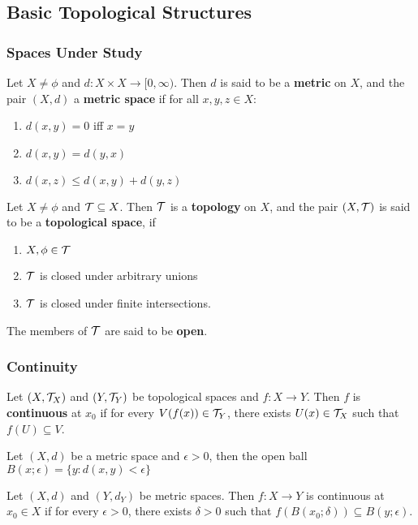 	\subsection{Basic Topological Structures}
		\begin{frame}
		\frametitle{Spaces Under Study}
		
		\begin{defn}
		Let $X\neq\phi$ and $d:X\times X\rightarrow [0,\infty)$. Then $d$ is said to be a \textbf{metric} on $X$, and the pair
		$(X,d)$ a \textbf{metric space} if for all $x,y,z\in X$:
			\begin{enumerate}
				\item $d(x,y) = 0$ iff $x=y$
				\item $d(x,y) = d(y,x)$
				\item $d(x,z) \leq d(x,y) + d(y,z)$
			\end{enumerate}
		\end{defn}
		
		\begin{defn}
		Let $X\neq\phi$ and $\mathcal{T}\subseteq X$. Then $\mathcal{T}$ is a \textbf{topology} on $X$, and the pair $(X,\mathcal{T})$ is said to be a \textbf{topological space}, if
			\begin{enumerate}
				\item $X,\phi\in\mathcal{T}$
				\item $\mathcal{T}$ is closed under arbitrary unions
				\item $\mathcal{T}$ is closed under finite intersections.
			\end{enumerate}
		The members of $\mathcal{T}$ are said to be \textbf{open}.
		\end{defn}
		\end{frame}
		
		\begin{frame}
		\frametitle{Continuity}
		
		\begin{defn}
		Let $(X,\mathcal{T}_X)$ and $(Y,\mathcal{T}_Y)$ be topological spaces and $f:X\rightarrow Y$. Then $f$ is \textbf{continuous} at $x_0$ if for every $V(f(x))\in\mathcal{T}_Y$, there exists $U(x)\in \mathcal{T}_X$ such that $f(U)\subseteq V$.
		\end{defn}
		
		\begin{defn}
		Let $(X,d)$ be a metric space and $\epsilon>0$, then the open ball $B(x;\epsilon)=\{y: d(x,y)<\epsilon\}$
		\end{defn}
		
		\begin{defn}
		Let $(X,d)$ and $(Y,d_Y)$ be metric spaces. Then $f:X\rightarrow Y$ is continuous at $x_0\in X$ if for every
		$\epsilon>0$, there exists $\delta>0$ such that $f(B(x_0;\delta))\subseteq B(y;\epsilon)$.
		\end{defn}		
		\end{frame}
		
